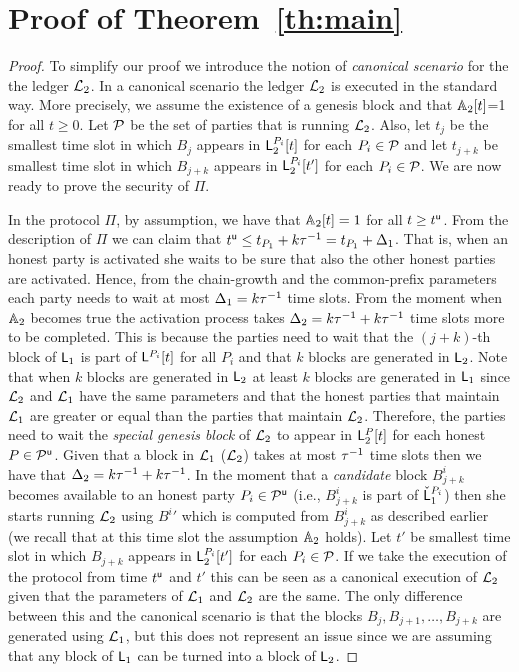 \section{Proof of Theorem~\ref{th:main}}\label{se:proof}
\begin{proof}
To simplify our proof we introduce the notion of \emph{canonical scenario} for the the ledger $\mathcal{L}_2$. In a canonical scenario the ledger
$\mathcal{L}_2$ is executed in the standard way. More precisely, 
we assume the existence of a genesis block and that $\mathbb{A}_2[t]$=1 for all $t\geq 0$. Let $\mathcal{P}$ be the set of parties that is running $\mathcal{L}_2$. Also, 
let $t_j$ be the smallest time slot in which $B_j$ appears in $\mathsf{L}_2^{P_i}[t]$ for each $P_i\in\mathcal{P}$ and let $t_{j+k}$ be smallest time slot in which $B_{j+k}$ appears in 
$\mathsf{L}_2^{P_i}[t']$ for each $P_i\in\mathcal{P}$.
We are now ready to prove the security of $\Pi$.

In the protocol $\Pi$, by assumption, we have that $\mathbb{A}_2[t]=1$ for all $t\geq t^{\mathsf{u}}$. From the description of $\Pi$ we can claim that $t^{\mathsf{u}} \leq t_{P_1}+k\tau^{-1}=t_{P_1}+\Delta_1$.
That is, when an honest party is activated she waits to be sure that also the other honest parties are activated. Hence, from the chain-growth and the common-prefix parameters
each party needs to wait at most $\Delta_1=k\tau^{-1}$ time slots.
From the moment when $\mathbb{A}_2$ becomes true the activation process takes $\Delta_2=k \tau^{-1} + k \tau^{-1}$  time slots more to be completed.
This is because the parties need to wait that the $(j+k)$-th block of $\mathsf{L}_1$ is part of $\mathsf{L}^{P_i}[t]$ for all $P_i$ and that $k$ blocks are generated in $\mathsf{L}_2$. Note that when $k$ blocks are generated in $\mathsf{L}_2$ at least 
$k$ blocks are generated in $\mathsf{L}_1$ since $\mathcal{L}_2$ and $\mathcal{L}_1$ have the same parameters and that the honest parties that maintain $\mathcal{L}_1$ are greater or equal than the parties that maintain $\mathcal{L}_2$. Therefore, the parties need to wait the \emph{special genesis block} of $\mathcal{L}_2$ to appear 
in $\mathsf{L}_2^P[t]$ for each honest $P\in\mathcal{P}^\mathsf{u}$. Given that a block in $\mathcal{L}_1$ ($\mathcal{L}_2$) takes at most $\tau^{-1}$ time slots then we have that $\Delta_2=k \tau^{-1} + k \tau^{-1}$.
In the moment that a \emph{candidate} block $B^i_{j+k}$ becomes available to an honest party $P_i\in\mathcal{P}^\mathsf{u}$ (i.e., $B^i_{j+k}$ is part of $\check {\mathsf{L}}_1^{P_i}$) then she starts running $\mathcal{L}_2$
using ${B^i}'$ which is computed from $B^i_{j+k}$ as described earlier (we recall that at this time slot the assumption $\mathbb{A}_2$ holds).
Let $t'$ be smallest time slot in which $B_{j+k}$ appears in $\mathsf{L}_2^{P_i}[t']$ for each $P_i\in\mathcal{P}$.
If we take the execution of the protocol from time $t^{\mathsf{u}}$ and $t'$ this can be seen as a canonical execution of $\mathcal{L}_2$ given
that the parameters of $\mathcal{L}_1$ and $\mathcal{L}_2$ are the same. The only difference between this and the canonical scenario is
that the blocks $B_{j}, B_{j+1},\dots, B_{j+k}$ are generated using $\mathcal{L}_1$, but this does not represent an issue since we are assuming that
any block of $\mathsf{L}_1$ can be turned into a block of $\mathsf{L}_2$. \end{proof}
